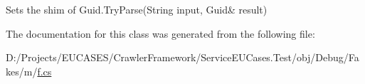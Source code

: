 Sets the shim of Guid.\-Try\-Parse(String input, Guid\& result)



The documentation for this class was generated from the following file\-:\begin{DoxyCompactItemize}
\item 
D\-:/\-Projects/\-E\-U\-C\-A\-S\-E\-S/\-Crawler\-Framework/\-Service\-E\-U\-Cases.\-Test/obj/\-Debug/\-Fakes/m/\hyperlink{m_2f_8cs}{f.\-cs}\end{DoxyCompactItemize}
